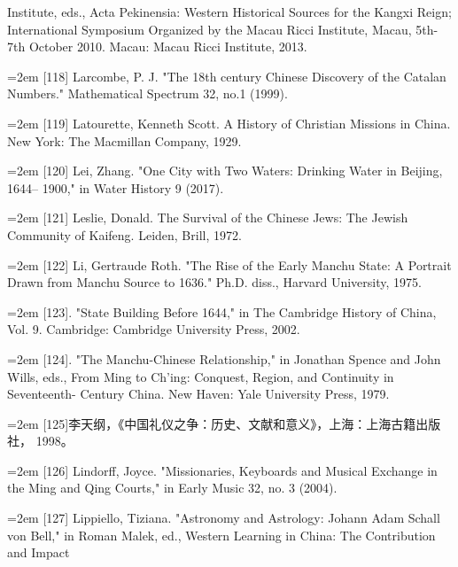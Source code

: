 Institute, eds., Acta Pekinensia: Western Historical Sources for the Kangxi Reign;%
\space%
International Symposium Organized by the Macau Ricci Institute, Macau, 5th-7th%
\space%
October 2010. Macau: Macau Ricci Institute, 2013.%
\par
\noindent\hangindent=2em
[118] Larcombe, P. J. "The 18th century Chinese Discovery of the Catalan Numbers."%
Mathematical Spectrum 32, no.1 (1999).%
\par
\noindent\hangindent=2em
[119] Latourette, Kenneth Scott. A History of Christian Missions in China. New York:%
\space%
The Macmillan Company, 1929.%
\par
\noindent\hangindent=2em
[120] Lei, Zhang. "One City with Two Waters: Drinking Water in Beijing, 1644–%
1900," in Water History 9 (2017).%
\par
\noindent\hangindent=2em
[121] Leslie, Donald. The Survival of the Chinese Jews: The Jewish Community of Kaifeng.%
\space%
Leiden, Brill, 1972.%
\par
\noindent\hangindent=2em
[122] Li, Gertraude Roth. "The Rise of the Early Manchu State: A Portrait Drawn%
\space%
from Manchu Source to 1636." Ph.D. diss., Harvard University, 1975.%
\par
\noindent\hangindent=2em
[123]. "State Building Before 1644," in The Cambridge History of China, Vol. 9.%
\space%
Cambridge: Cambridge University Press, 2002.%
\par
\noindent\hangindent=2em
[124]. "The Manchu-Chinese Relationship," in Jonathan Spence and John Wills,%
\space%
eds., From Ming to Ch'ing: Conquest, Region, and Continuity in Seventeenth-%
Century China. New Haven: Yale University Press, 1979.%
\par
\noindent\hangindent=2em
[125]李天纲，《中国礼仪之争：历史、文献和意义》，上海：上海古籍出版社，%
1998。%
\par
\noindent\hangindent=2em
[126] Lindorff, Joyce. "Missionaries, Keyboards and Musical Exchange in the Ming%
\space%
and Qing Courts," in Early Music 32, no. 3 (2004).%
\par
\noindent\hangindent=2em
[127] Lippiello, Tiziana. "Astronomy and Astrology: Johann Adam Schall von Bell,"%
in Roman Malek, ed., Western Learning in China: The Contribution and Impact%
